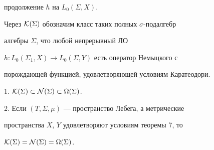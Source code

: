 продолжение $h$ на $L_0(\Sigma, X)$.





Через ${\cal K}(\Sigma)$ обозначим класс таких полных $\sigma$-подал\-гебр


алгебры $\Sigma$, что любой непрерывный ЛО


$h:L_0(\Sigma_1,X)\to L_0(\Sigma,Y)$ есть оператор Немыцкого с


порождающей функцией, удовлетворяющей условиям Каратеодори.





\begin{cor}


1. ${\cal K}(\Sigma)\subset{\cal N}(\Sigma)\subset{\Omega}(\Sigma)$.





2. Если $(T,\Sigma,\mu)$ --- пространство Лебега, а метрические


пространства $X$, $Y$ удовлетворяют условиям теоремы 7, то


${\cal K}(\Sigma)={\cal N}(\Sigma)={\Omega}(\Sigma)$.


\end{cor}





